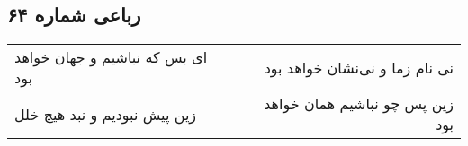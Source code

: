 \begin{center}
\section*{رباعی شماره ۶۴}
\label{sec:sh064}
\begin{longtable}{l p{0.5cm} r}
ای بس که نباشیم و جهان خواهد بود
&&
نی نام زما و نی‌نشان خواهد بود
\\
زین پیش نبودیم و نبد هیچ خلل
&&
زین پس چو نباشیم همان خواهد بود
\\
\end{longtable}
\end{center}
